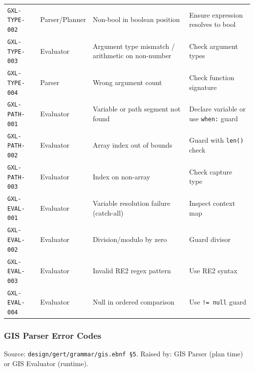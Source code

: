 \begin{center}
\begin{tabular}{p{3.5cm}p{1.8cm}p{5.5cm}p{3.5cm}}
\texttt{GXL-TYPE-002}  & Parser/Planner & Non-bool in boolean position & Ensure expression resolves to bool \\
\texttt{GXL-TYPE-003}  & Evaluator & Argument type mismatch / arithmetic on non-number & Check argument types \\
\texttt{GXL-TYPE-004}  & Parser & Wrong argument count & Check function signature \\
\texttt{GXL-PATH-001}  & Evaluator & Variable or path segment not found & Declare variable or use \texttt{when:} guard \\
\texttt{GXL-PATH-002}  & Evaluator & Array index out of bounds & Guard with \texttt{len()} check \\
\texttt{GXL-PATH-003}  & Evaluator & Index on non-array & Check capture type \\
\texttt{GXL-EVAL-001}  & Evaluator & Variable resolution failure (catch-all) & Inspect context map \\
\texttt{GXL-EVAL-002}  & Evaluator & Division/modulo by zero & Guard divisor \\
\texttt{GXL-EVAL-003}  & Evaluator & Invalid RE2 regex pattern & Use RE2 syntax \\
\texttt{GXL-EVAL-004}  & Evaluator & Null in ordered comparison & Use \texttt{!= null} guard \\
\hline
\end{tabular}
\end{center}

\subsubsection{GIS Parser Error Codes}
\label{sec:parse-gate:error-codes:gis}

Source: \texttt{design/gert/grammar/gis.ebnf~\S5}.
Raised by: GIS Parser (plan time) or GIS Evaluator (runtime).

